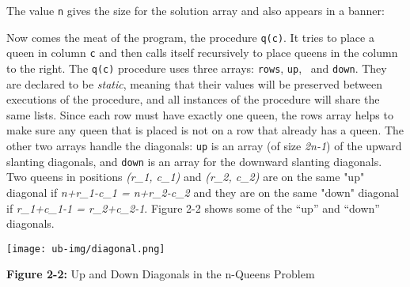 
The value \texttt{n} gives the size for the solution array and also
appears in a banner:


Now comes the meat of the program, the procedure \texttt{q(c)}. It tries
to place a queen in column \texttt{c} and then calls itself recursively
to place queens in the column to the right. The \texttt{q(c)} procedure
uses three arrays: \texttt{rows}, \texttt{up}, \ and \texttt{down}.
They are declared to be \textit{static}, meaning that their values will
be preserved between executions of the procedure, and all
instances of the procedure will share the same lists.
Since each row must have exactly one queen, the rows array helps to
make sure any queen that is placed is not on a row that already has a
queen. The other two arrays handle the diagonals: \texttt{up} is an
array (of size \textit{2n-1}) of the upward slanting diagonals, and
\texttt{down} is an array for the downward slanting diagonals. Two
queens in positions \textit{(r\_1, c\_1)} and \textit{(r\_2, c\_2)} are
on the same "up" diagonal if
\textit{n+r\_1-c\_1 = n+r\_2-c\_2} and they are on the same
"down" diagonal if \textit{r\_1+c\_1-1 =
r\_2+c\_2-1}. Figure 2-2 shows some of the
``up'' and ``down'' diagonals.

\bigskip

\begin{center}
\texttt{[image: ub-img/diagonal.png]}
\end{center}
{\sffamily\bfseries Figure 2-2:}
{\sffamily Up and Down Diagonals in the n-Queens Problem}

\bigskip


